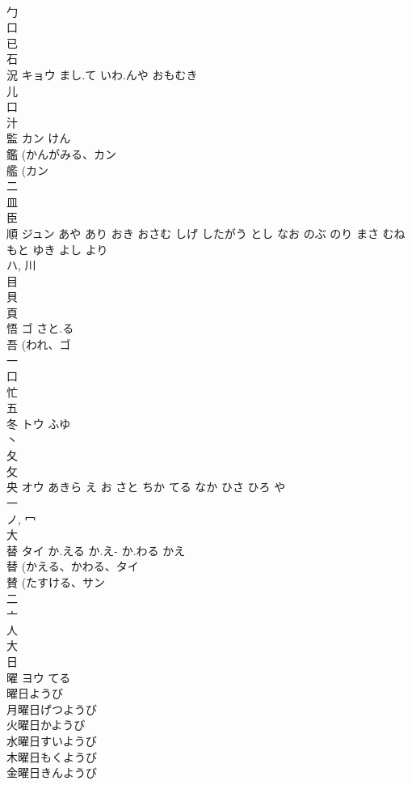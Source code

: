 \documentclass[8pt]{extreport}
\begin{document}
\begin{CJK}{UTF8}{min}
\\	勹 
\\	口 
\\	已 
\\	石 
\\	況	キョウ	まし.て いわ.んや おもむき	
\\	儿 
\\	口 
\\	汁 
\\	監	カン	けん	
\\	鑑 (かんがみる、カン 
\\	艦 (カン 
\\	二 
\\	皿 
\\	臣 
\\	順	ジュン	あや あり おき おさむ しげ したがう とし なお のぶ のり まさ むね もと ゆき よし より	
\\	ハ, 川 
\\	目 
\\	貝 
\\	頁 
\\	悟	ゴ	さと.る	
\\	吾 (われ、ゴ 
\\	一 
\\	口 
\\	忙 
\\	五 
\\	冬	トウ	ふゆ	
\\	丶 
\\	夂 
\\	攵 
\\	央	オウ	あきら え お さと ちか てる なか ひさ ひろ や	
\\	一 
\\	ノ, 冖 
\\	大 
\\	替	タイ	か.える か.え- か.わる かえ	
\\	替 (かえる、かわる、タイ 
\\	賛 (たすける、サン 
\\	二 
\\	亠 
\\	人 
\\	大 
\\	日 
\\	曜	ヨウ	てる	
\\	曜日ようび
\\	月曜日げつようび
\\	火曜日かようび
\\	水曜日すいようび
\\	木曜日もくようび
\\	金曜日きんようび

\end{CJK}
\end{document}
